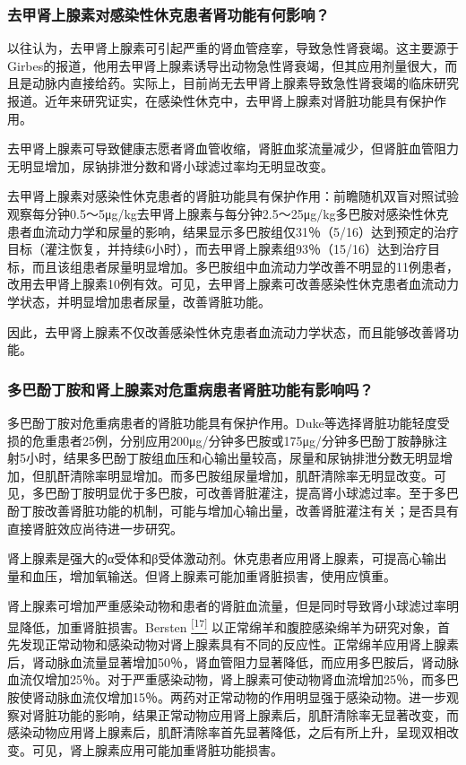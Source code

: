 \subsubsection{去甲肾上腺素对感染性休克患者肾功能有何影响？}

以往认为，去甲肾上腺素可引起严重的肾血管痉挛，导致急性肾衰竭。这主要源于Girbes的报道，他用去甲肾上腺素诱导出动物急性肾衰竭，但其应用剂量很大，而且是动脉内直接给药。实际上，目前尚无去甲肾上腺素导致急性肾衰竭的临床研究报道。近年来研究证实，在感染性休克中，去甲肾上腺素对肾脏功能具有保护作用。

去甲肾上腺素可导致健康志愿者肾血管收缩，肾脏血浆流量减少，但肾脏血管阻力无明显增加，尿钠排泄分数和肾小球滤过率均无明显改变。

去甲肾上腺素对感染性休克患者的肾脏功能具有保护作用：前瞻随机双盲对照试验观察每分钟0.5～5μg/kg去甲肾上腺素与每分钟2.5～25μg/kg多巴胺对感染性休克患者血流动力学和尿量的影响，结果显示多巴胺组仅31％（5/16）达到预定的治疗目标（灌注恢复，并持续6小时），而去甲肾上腺素组93％（15/16）达到治疗目标，而且该组患者尿量明显增加。多巴胺组中血流动力学改善不明显的11例患者，改用去甲肾上腺素10例有效。可见，去甲肾上腺素可改善感染性休克患者血流动力学状态，并明显增加患者尿量，改善肾脏功能。

因此，去甲肾上腺素不仅改善感染性休克患者血流动力学状态，而且能够改善肾功能。

\subsubsection{多巴酚丁胺和肾上腺素对危重病患者肾脏功能有影响吗？}

多巴酚丁胺对危重病患者的肾脏功能具有保护作用。Duke等选择肾脏功能轻度受损的危重患者25例，分别应用200μg/分钟多巴胺或175μg/分钟多巴酚丁胺静脉注射5小时，结果多巴酚丁胺组血压和心输出量较高，尿量和尿钠排泄分数无明显增加，但肌酐清除率明显增加。而多巴胺组尿量增加，肌酐清除率无明显改变。可见，多巴酚丁胺明显优于多巴胺，可改善肾脏灌注，提高肾小球滤过率。至于多巴酚丁胺改善肾脏功能的机制，可能与增加心输出量，改善肾脏灌注有关；是否具有直接肾脏效应尚待进一步研究。

肾上腺素是强大的α受体和β受体激动剂。休克患者应用肾上腺素，可提高心输出量和血压，增加氧输送。但肾上腺素可能加重肾脏损害，使用应慎重。

肾上腺素可增加严重感染动物和患者的肾脏血流量，但是同时导致肾小球滤过率明显降低，加重肾脏损害。Bersten
\protect\hyperlink{text00008.htmlux5cux23ch17-7}{\textsuperscript{{[}17{]}}}
以正常绵羊和腹腔感染绵羊为研究对象，首先发现正常动物和感染动物对肾上腺素具有不同的反应性。正常绵羊应用肾上腺素后，肾动脉血流量显著增加50％，肾血管阻力显著降低，而应用多巴胺后，肾动脉血流仅增加25％。对于严重感染动物，肾上腺素可使动物肾血流增加25％，而多巴胺使肾动脉血流仅增加15％。两药对正常动物的作用明显强于感染动物。进一步观察对肾脏功能的影响，结果正常动物应用肾上腺素后，肌酐清除率无显著改变，而感染动物应用肾上腺素后，肌酐清除率首先显著降低，之后有所上升，呈现双相改变。可见，肾上腺素应用可能加重肾脏功能损害。

